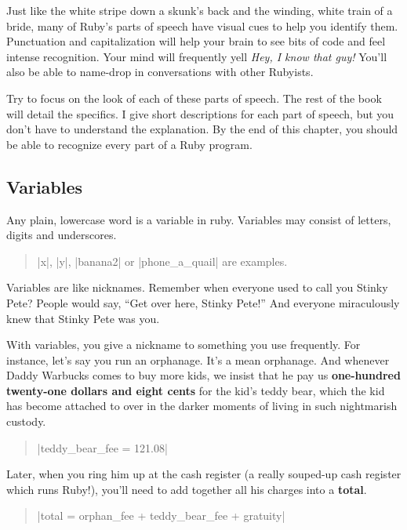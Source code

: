 \documentclass[12pt,twoside]{report}
\begin{document}
Just like the white stripe down a skunk's back and the winding, white
train of a bride, many of Ruby's parts of speech have visual cues to
help you identify them.  Punctuation and capitalization will help your
brain to see bits of code and feel intense recognition. Your mind will
frequently yell {\em Hey, I know that guy!}  You'll also be able to
name-drop in conversations with other Rubyists.

Try to focus on the look of each of these parts of speech.  The rest
of the book will detail the specifics.  I give short descriptions for
each part of speech, but you don't have to understand the explanation.
By the end of this chapter, you should be able to recognize every part
of a Ruby program.



\subsection{Variables}



Any plain, lowercase word is a variable in ruby.  Variables may
consist of letters, digits and underscores.

\begin{quote}
\rubyinline|x|, \rubyinline|y|,
\rubyinline|banana2| or
\rubyinline|phone_a_quail| are examples.\end{quote}


Variables are like nicknames.  Remember when everyone used to call you
Stinky Pete? People would say, ``Get over here, Stinky Pete!''  And
everyone miraculously knew that Stinky Pete was you.

With variables, you give a nickname to something you use frequently.
For instance, let's say you run an orphanage.  It's a mean orphanage.
And whenever Daddy Warbucks comes to buy more kids, we insist that he
pay us {\bf one-hundred twenty-one dollars and eight cents} for the
kid's teddy bear, which the kid has become attached to over in the
darker moments of living in such nightmarish custody.

\begin{quote}
\rubyinline|teddy_bear_fee = 121.08|\end{quote}


Later, when you ring him up at the cash register (a really souped-up
cash register which runs Ruby!), you'll need to add together all his
charges into a {\bf total}.

\begin{quote}
\rubyinline|total = orphan_fee + teddy_bear_fee + gratuity|\end{quote}
\end{document}
